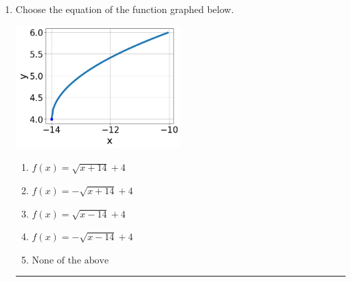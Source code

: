 \documentclass[14pt]{extbook}
\newcommand{\litem}[1]{\item#1\hspace*{-1cm}\rule{\textwidth}{0.4pt}}
\begin{document}
\begin{enumerate}
\litem{
Choose the equation of the function graphed below.
\begin{center}
    \includegraphics[width=0.5\textwidth]{../Figures/radicalGraphToEquationC.png}
\end{center}
\begin{enumerate}[label=\Alph*.]
\item \( f(x) = \sqrt{x + 14} + 4 \)
\item \( f(x) = - \sqrt{x + 14} + 4 \)
\item \( f(x) = \sqrt{x - 14} + 4 \)
\item \( f(x) = - \sqrt{x - 14} + 4 \)
\item \( \text{None of the above} \)


\end{enumerate}}
\end{enumerate}
\end{document}
